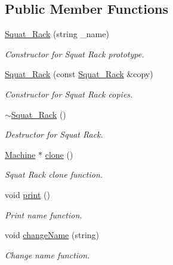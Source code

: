 \subsection*{Public Member Functions}
\begin{DoxyCompactItemize}
\item 
\hyperlink{class_squat___rack_a7914ba2400f02ef59e49a246c518428b}{Squat\+\_\+\+Rack} (string \+\_\+name)
\begin{DoxyCompactList}\small\item\em Constructor for Squat Rack prototype. \end{DoxyCompactList}\item 
\hyperlink{class_squat___rack_a17d776321a5c097a894fb703829a433e}{Squat\+\_\+\+Rack} (const \hyperlink{class_squat___rack}{Squat\+\_\+\+Rack} \&copy)
\begin{DoxyCompactList}\small\item\em Constructor for Squat Rack copies. \end{DoxyCompactList}\item 
\hypertarget{class_squat___rack_af5d168b52a31ca3129f8864991137440}{}\hyperlink{class_squat___rack_af5d168b52a31ca3129f8864991137440}{$\sim$\+Squat\+\_\+\+Rack} ()\label{class_squat___rack_af5d168b52a31ca3129f8864991137440}

\begin{DoxyCompactList}\small\item\em Destructor for Squat Rack. \end{DoxyCompactList}\item 
\hyperlink{class_machine}{Machine} $\ast$ \hyperlink{class_squat___rack_a6eceabbfc212c9d513a6eb335da43916}{clone} ()
\begin{DoxyCompactList}\small\item\em Squat Rack clone function. \end{DoxyCompactList}\item 
void \hyperlink{class_squat___rack_a63321b3a00a68f82c42d5713ac01f24f}{print} ()
\begin{DoxyCompactList}\small\item\em Print name function. \end{DoxyCompactList}\item 
void \hyperlink{class_squat___rack_ad309d281458a753255ed8c4c6f5a24d4}{change\+Name} (string)
\begin{DoxyCompactList}\small\item\em Change name function. \end{DoxyCompactList}\end{DoxyCompactItemize}


